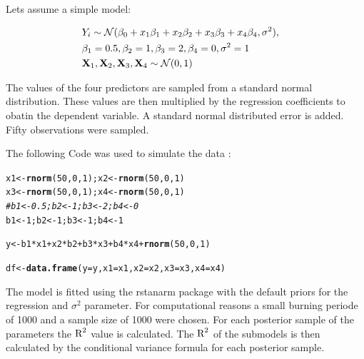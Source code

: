 \documentclass[11pt,a4paper,twoside]{book}\usepackage[]{graphicx}\usepackage[]{color}
\makeatletter
\newcommand{\hlnum}[1]{\textcolor[rgb]{0.686,0.059,0.569}{#1}}%
\newcommand{\hlcom}[1]{\textcolor[rgb]{0.678,0.584,0.686}{\textit{#1}}}%
\newcommand{\hlopt}[1]{\textcolor[rgb]{0,0,0}{#1}}%
\newcommand{\hlstd}[1]{\textcolor[rgb]{0.345,0.345,0.345}{#1}}%
\newcommand{\hlkwb}[1]{\textcolor[rgb]{0.69,0.353,0.396}{#1}}%
\newcommand{\hlkwc}[1]{\textcolor[rgb]{0.333,0.667,0.333}{#1}}%
\newcommand{\hlkwd}[1]{\textcolor[rgb]{0.737,0.353,0.396}{\textbf{#1}}}%
\newenvironment{kframe}{%
 \def\at@end@of@kframe{}%
 \ifinner\ifhmode%
  \def\at@end@of@kframe{\end{minipage}}%
  \begin{minipage}{\columnwidth}%
 \fi\fi%
 \def\FrameCommand##1{\hskip\@totalleftmargin \hskip-\fboxsep
 \colorbox{shadecolor}{##1}\hskip-\fboxsep
     \hskip-\linewidth \hskip-\@totalleftmargin \hskip\columnwidth}%
 \MakeFramed {\advance\hsize-\width
   \@totalleftmargin\z@ \linewidth\hsize
   \@setminipage}}%
 {\par\unskip\endMakeFramed%
 \at@end@of@kframe}
\newenvironment{knitrout}{}{} %
\makeatother
\begin{document}
Lets assume a simple model: 

\begin{align} 
&Y_{i} \sim \mathcal{N}(\beta_{0}+x_{1} \beta_{1}+x_{2} \beta_{2}+x_{3} \beta_{3}+x_{4} \beta_{4}, \sigma^2),& \\ & \beta_{1} = 0.5, \beta_{2} = 1,  \beta_{3} = 2 , \beta_{4}=0, \sigma^2 = 1 & \\ & {\mathbf{X}}_{1}, {\mathbf{X}}_{2},{\mathbf{X}}_{3},{\mathbf{X}}_{4} \sim \mathcal{N}(0, 1)&
\end{align} 


The values of the four predictors are sampled from a standard normal distribution. These values are then multiplied by the regression coefficients to obatin the dependent variable. A standard normal distributed error is added. Fifty observations were sampled.

The following Code was used to simulate the data :

\begin{knitrout}
\color{fgcolor}\begin{kframe}
\begin{alltt}
\hlstd{x1} \hlkwb{<-} \hlkwd{rnorm}\hlstd{(}\hlnum{50}\hlstd{,} \hlnum{0}\hlstd{,} \hlnum{1}\hlstd{); x2} \hlkwb{<-} \hlkwd{rnorm}\hlstd{(}\hlnum{50}\hlstd{,} \hlnum{0}\hlstd{,} \hlnum{1}\hlstd{)}
\hlstd{x3} \hlkwb{<-} \hlkwd{rnorm}\hlstd{(}\hlnum{50}\hlstd{,} \hlnum{0}\hlstd{,} \hlnum{1}\hlstd{); x4} \hlkwb{<-} \hlkwd{rnorm}\hlstd{(}\hlnum{50}\hlstd{,} \hlnum{0}\hlstd{,} \hlnum{1}\hlstd{)}
\hlcom{#b1 <- 0.5; b2 <- 1; b3 <- 2; b4 <- 0}
\hlstd{b1} \hlkwb{<-} \hlnum{1}\hlstd{; b2} \hlkwb{<-} \hlnum{1}\hlstd{; b3} \hlkwb{<-} \hlnum{1}\hlstd{; b4} \hlkwb{<-} \hlnum{1}

\hlstd{y} \hlkwb{<-} \hlstd{b1}\hlopt{*}\hlstd{x1} \hlopt{+} \hlstd{x2}\hlopt{*}\hlstd{b2} \hlopt{+} \hlstd{b3}\hlopt{*}\hlstd{x3} \hlopt{+} \hlstd{b4}\hlopt{*}\hlstd{x4} \hlopt{+} \hlkwd{rnorm}\hlstd{(}\hlnum{50}\hlstd{,} \hlnum{0}\hlstd{,} \hlnum{1}\hlstd{)}

\hlstd{df} \hlkwb{<-} \hlkwd{data.frame}\hlstd{(}\hlkwc{y} \hlstd{= y,} \hlkwc{x1} \hlstd{= x1,} \hlkwc{x2} \hlstd{= x2,} \hlkwc{x3} \hlstd{= x3,} \hlkwc{x4} \hlstd{= x4)}
\end{alltt}
\end{kframe}
\end{knitrout}


The model is fitted using the rstanarm package with the default priors for the regression and $\sigma^2$ parameter. For computational reasons a small burning periode of 1000 and a sample size of 1000 were chosen. For each posterior sample of the parameters the $\text{R}^2$ value is calculated. The $\text{R}^2$ of the submodels is then calculated by the conditional variance formula for each posterior sample.
\end{document}
